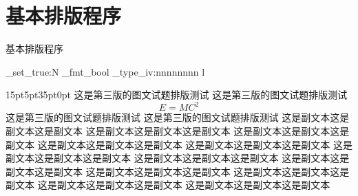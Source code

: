 \documentclass[a4paper,fontset = windowsnew]{ctexbook}
\begin{document}
\chapter{基本排版程序}

\parindent=0pt


基本排版程序

\par

\ExplSyntaxOn

\bool_set_true:N \cexam_fmt_bool
    \cexam_type_iv:nnnnnnnn
    {l}
      {
      }
      {15pt}{5pt}{35pt}{0pt}%
      {
	这是第三版的图文试题排版测试
	这是第三版的图文试题排版测试
	\begin{equation}
	  E=MC^2
	\end{equation}
	这是第三版的图文试题排版测试
	这是第三版的图文试题排版测试
      }
      {
	这是副文本这是副文本这是副文本
	这是副文本这是副文本这是副文本
	这是副文本这是副文本这是副文本
	这是副文本这是副文本这是副文本
	这是副文本这是副文本这是副文本
	这是副文本这是副文本这是副文本
	这是副文本这是副文本这是副文本
	这是副文本这是副文本这是副文本
	这是副文本这是副文本这是副文本
	这是副文本这是副文本这是副文本
	这是副文本这是副文本这是副文本
	这是副文本这是副文本这是副文本
      }



    
\end{document}
